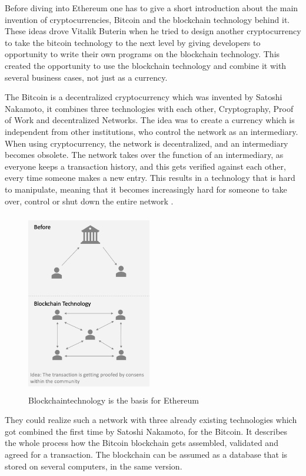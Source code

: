 Before diving into Ethereum one has to give a short introduction about the main invention of cryptocurrencies, Bitcoin and the blockchain technology behind it. 
These ideas drove Vitalik Buterin when he tried to design another cryptocurrency to take the bitcoin technology to the next level by giving developers to opportunity to write their own programs on the blockchain technology. 
This created the opportunity to use the blockchain technology and combine it with several business cases, not just as a currency. 

The Bitcoin is a decentralized cryptocurrency which was invented by Satoshi Nakamoto, it combines three technologies with each other, Cryptography, Proof of Work and decentralized Networks. The idea was to create a currency which is independent from other institutions, who control the network as an intermediary. When using cryptocurrency, the network is decentralized, and an intermediary becomes obsolete. 
The network takes over the function of an intermediary, as everyone keeps a transaction history, and this gets verified against each other, every time someone makes a new entry.
This results in a technology that is hard to manipulate, meaning that it becomes increasingly hard for someone to take over, control or shut down the entire network \cite{grishchenko2018semantic}.

\begin{figure}[ht]
\centering
\caption{Blockchaintechnology is the basis for Ethereum \cite{preethi}}
\includegraphics[width=0.485\textwidth, height=300px]{blockchaintech}
\end{figure}

They could realize such a network with three already existing technologies which got combined the first time by Satoshi Nakamoto, for the Bitcoin. 
It describes the whole process how the Bitcoin blockchain gets assembled, validated and agreed for a transaction. 
The blockchain can be assumed as a database that is stored on several computers, in the same version\cite{grishchenko2018semantic}.

